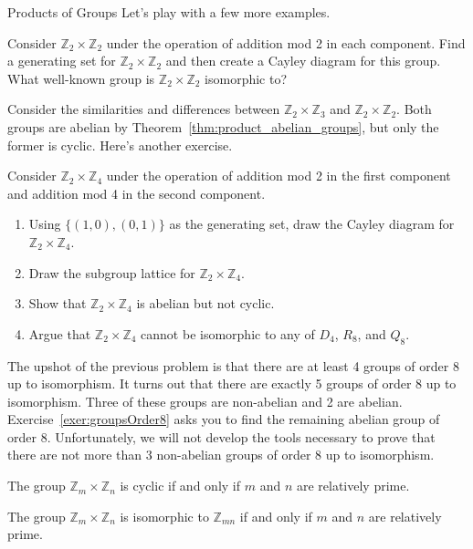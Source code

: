 \begin{section}{Products of Groups}
Let's play with a few more examples.

\begin{exercise}
Consider $\mathbb{Z}_2\times \mathbb{Z}_2$ under the operation of addition mod 2 in each component.  Find a generating set for $\mathbb{Z}_2\times \mathbb{Z}_2$ and then create a Cayley diagram for this group.  What well-known group is $\mathbb{Z}_2\times \mathbb{Z}_2$ isomorphic to?
\end{exercise}

Consider the similarities and differences between $\mathbb{Z}_2\times \mathbb{Z}_3$ and $\mathbb{Z}_2\times \mathbb{Z}_2$.  Both groups are abelian by Theorem~\ref{thm:product_abelian_groups}, but only the former is cyclic.  Here's another exercise.

\begin{problem}
Consider $\mathbb{Z}_2\times \mathbb{Z}_4$ under the operation of addition mod 2 in the first component and addition mod 4 in the second component. 
\begin{enumerate}[label=\rm{(\alph*)}]
\item Using $\{(1,0),(0,1)\}$ as the generating set, draw the Cayley diagram for $\mathbb{Z}_2\times \mathbb{Z}_4$.
\item Draw the subgroup lattice for $\mathbb{Z}_2\times \mathbb{Z}_4$.
\item Show that $\mathbb{Z}_2\times \mathbb{Z}_4$ is abelian but not cyclic.
\item Argue that $\mathbb{Z}_2\times \mathbb{Z}_4$ cannot be isomorphic to any of $D_4$, $R_8$, and $Q_8$.
\end{enumerate}
\end{problem}

The upshot of the previous problem is that there are at least 4 groups of order 8 up to isomorphism.  It turns out that there are exactly 5 groups of order 8 up to isomorphism.  Three of these groups are non-abelian and 2 are abelian.  Exercise~\ref{exer:groupsOrder8} asks you to find the remaining abelian group of order 8.  Unfortunately, we will not develop the tools necessary to prove that there are not more than 3 non-abelian groups of order 8 up to isomorphism.

\begin{theorem}
The group $\mathbb{Z}_m\times \mathbb{Z}_n$ is cyclic if and only if $m$ and $n$ are relatively prime.
\end{theorem}

\begin{corollary}
The group $\mathbb{Z}_m\times \mathbb{Z}_n$ is isomorphic to $\mathbb{Z}_{mn}$ if and only if $m$ and $n$ are relatively prime.
\end{corollary}


\end{section}
